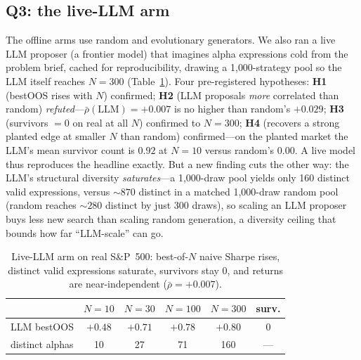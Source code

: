 \documentclass[sigconf]{acmart}
\begin{document}
\subsection{Q3: the live-LLM arm}
The offline arms use random and evolutionary generators. We also ran a live LLM proposer (a frontier model) that imagines alpha expressions cold from the problem brief, cached for reproducibility, drawing a 1{,}000-strategy pool so the LLM itself reaches $N{=}300$ (Table~\ref{tab:llm}). Four pre-registered hypotheses: \textbf{H1} (bestOOS rises with $N$) confirmed; \textbf{H2} (LLM proposals \emph{more} correlated than random) \emph{refuted}---$\bar\rho(\text{LLM}){=}{+}0.007$ is no higher than random's $+0.029$; \textbf{H3} (survivors $=0$ on real at all $N$) confirmed to $N{=}300$; \textbf{H4} (recovers a strong planted edge at smaller $N$ than random) confirmed---on the planted market the LLM's mean survivor count is $0.92$ at $N{=}10$ versus random's $0.00$. A live model thus reproduces the headline exactly. But a new finding cuts the other way: the LLM's structural diversity \emph{saturates}---a 1{,}000-draw pool yields only 160 distinct valid expressions, versus ${\sim}870$ distinct in a matched 1{,}000-draw random pool (random reaches ${\sim}280$ distinct by just 300 draws), so scaling an LLM proposer buys less new search than scaling random generation, a diversity ceiling that bounds how far ``LLM-scale'' can go.

\begin{table}[t]
\caption{Live-LLM arm on real S\&P~500: best-of-$N$ naive Sharpe rises, distinct valid expressions saturate, survivors stay 0, and returns are near-independent ($\bar\rho{=}{+}0.007$).}
\label{tab:llm}
\small
\begin{tabular}{@{}lccccc@{}}
\toprule
& $N{=}10$ & $N{=}30$ & $N{=}100$ & $N{=}300$ & surv. \\
\midrule
LLM bestOOS & $+0.48$ & $+0.71$ & $+0.78$ & $+0.80$ & 0 \\
distinct alphas & 10 & 27 & 71 & 160 & --- \\
\bottomrule
\end{tabular}
\end{table}
\end{document}
